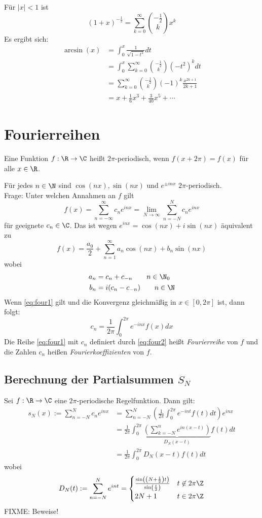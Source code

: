 \documentclass{mycourse}
\begin{document}
\begin{thm}
\begin{ex*}
Für $|x|<1$  ist
\[
(1+x)^{-\frac 12} = \sum_{k=0}^\infty\binom{-\frac 12}kx^k
\]
Es ergibt sich:
\begin{align*}
\arcsin(x)&=\int_0^x\frac 1{\sqrt{1-t^2}}dt\\
&=\int_0^x\sum_{k=0}^\infty\binom{-\frac 12}k(-t^2)^kdt\\
&=\sum_{k=0}^\infty\binom{-\frac 12}k(-1)^k\frac{x^{2k+1}}{2k+1}\\
&=x+\frac 16x^3+\frac 3{40}x^5+ \dotsb
\end{align*}
\end{ex*}
\end{thm}

\section{Fourierreihen}

Eine Funktion $f:\R\to\C$ heißt $2\pi$-periodisch, wenn $f(x+2\pi)=f(x)$ für alle $x\in\R$.

Für jedes $n\in\N$ sind $\cos(nx), \sin(nx)$ und $e^{\pm inx}$ $2\pi$-periodisch.\\
Frage: Unter welchen Annahmen an $f$ gilt
\[
\label{eq:four1}
f(x)=\sum_{n=-\infty}^\infty c_ne^{inx}=\lim_{N\to\infty}\sum_{n=-N}^Nc_ne^{inx}
\]
für geeignete $c_n\in\C$.
Das ist wegen $e^{inx}=\cos(nx) +i\sin(nx)$ äquivalent zu
\[
f(x)=\frac{a_0}2+\sum_{n=1}^\infty a_n\cos(nx)+b_n\sin(nx)
\]
wobei
\begin{align*}
a_n&=c_n+c_{-n} \qquad n\in\N_0\\
 b_n&=i(c_n-c_{-n}) \qquad n\in\N
\end{align*}
Wenn \eqref{eq:four1} gilt und die Konvergenz gleichmäßig in $x\in[0,2\pi]$ ist, dann folgt:
\[
\label{eq:four2}
c_n=\frac 1{2\pi}\int_0^{2\pi}e^{-inx}f(x)dx
\]
Die Reihe \eqref{eq:four1} mit $c_n$ definiert durch \eqref{eq:four2} heißt \emph{Fourierreihe} von $f$ und die Zahlen $c_n$ heißen \emph{Fourierkoeffizienten} von $f$.

\subsection*{Berechnung der Partialsummen $S_N$}

Sei $f:\R\to\C$ eine $2\pi$-periodische Regelfunktion.
Dann gilt:
\begin{align*}
s_N(x):=\sum_{n=-N}^Nc_ne^{inx}
&=\sum_{n=-N}^N\left(\frac 1{2\pi}\int_0^{2\pi}e^{-int}f(t)dt\right)e^{inx}\\
&=\frac 1{2\pi}\int_0^{2\pi}\underbrace{\left(\sum_{k=-N}^ne^{in(x-t)}\right)}_{D_N(x-t)}f(t)dt\\
&=\frac 1{2\pi}\int_0^{2\pi}D_N(x-t)f(t)dt
\end{align*}
wobei
\[
D_N(t):=\sum_{n=-N}^Ne^{int}=\begin{cases}
\frac{\sin\left(\left(N+\frac 12\right)t\right)}{\sin\left(\frac t2\right)} & t\not\in 2\pi\Z\\
2N+1 & t\in 2\pi\Z
\end{cases}
\]
FIXME: Beweise!
\end{document}
